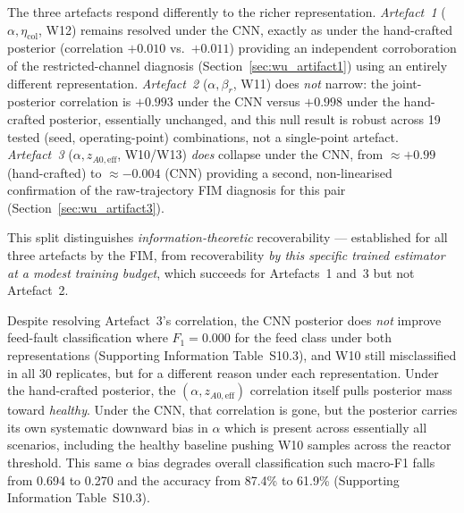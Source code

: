 \documentclass[aps,pre,twocolumn,superscriptaddress]{revtex4-2}
\begin{document}
The three artefacts respond differently to the richer representation.
\emph{Artefact~1} ($\alpha,\eta_\mathrm{col}$, W12) remains resolved under the
CNN, exactly as under the hand-crafted posterior (correlation $+0.010$ vs.\
$+0.011$) providing an independent corroboration of the restricted-channel diagnosis
(Section~\ref{sec:wu_artifact1}) using an entirely different representation.
\emph{Artefact~2} ($\alpha,\beta_r$, W11) does \emph{not} narrow: the
joint-posterior correlation is $+0.993$ under the CNN versus $+0.998$ under
the hand-crafted posterior, essentially unchanged, and this null result is
robust across 19 tested (seed, operating-point) combinations, not a
single-point artefact. \emph{Artefact~3} ($\alpha, z_{A0,\mathrm{eff}}$,
W10/W13) \emph{does} collapse under the CNN, from $\approx+0.99$
(hand-crafted) to $\approx-0.004$ (CNN) providing a second, non-linearised
confirmation of the raw-trajectory FIM diagnosis for this pair
(Section~\ref{sec:wu_artifact3}).

This split distinguishes \emph{information-theoretic} recoverability ---
established for all three artefacts by the FIM, %
from recoverability \emph{by this
specific trained estimator at a modest training budget}, which succeeds for
Artefacts~1 and~3 but not Artefact~2.

Despite resolving Artefact~3's correlation, the CNN posterior does
\emph{not} improve feed-fault classification where $F_1=0.000$ for the feed class
under both representations (Supporting Information Table~S10.3), and W10 still
misclassified in all 30 replicates, but for a different reason under each
representation. Under the hand-crafted posterior, the
$(\alpha,z_{A0,\mathrm{eff}})$ correlation itself pulls posterior mass toward
\emph{healthy}. Under the CNN, that correlation is gone, but the posterior
carries its own systematic downward bias in $\alpha$ which is present across
essentially all scenarios, including the healthy baseline pushing
W10 samples across the reactor threshold.  This same $\alpha$ bias
degrades overall classification such macro-F1 falls from 0.694 to 0.270 and the
accuracy from 87.4\% to 61.9\% (Supporting Information Table~S10.3).
\end{document}
